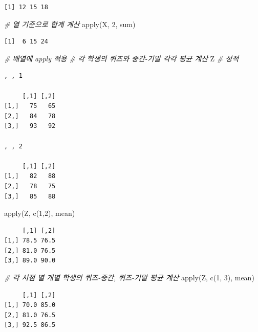 \documentclass[
  11pt,
]{krantz}
\newenvironment{Shaded}{\begin{snugshade}}{\end{snugshade}}
\newcommand{\CommentTok}[1]{\textcolor[rgb]{0.37,0.37,0.37}{\textit{#1}}}
\newcommand{\DecValTok}[1]{\textcolor[rgb]{0.06,0.06,0.06}{#1}}
\newcommand{\FunctionTok}[1]{\textcolor[rgb]{0,0,0}{#1}}
\newcommand{\NormalTok}[1]{#1}
\begin{document}
\begin{verbatim}
[1] 12 15 18
\end{verbatim}

\begin{Shaded}
\begin{Highlighting}[]
\CommentTok{\# 열 기준으로 합계 계산}
\FunctionTok{apply}\NormalTok{(X, }\DecValTok{2}\NormalTok{, sum)}
\end{Highlighting}
\end{Shaded}

\begin{verbatim}
[1]  6 15 24
\end{verbatim}

\begin{Shaded}
\begin{Highlighting}[]
\CommentTok{\# 배열에 apply 적용}
\CommentTok{\# 각 학생의 퀴즈와 중간{-}기말 각각 평균 계산}
\NormalTok{Z }\CommentTok{\# 성적}
\end{Highlighting}
\end{Shaded}

\begin{verbatim}
, , 1

     [,1] [,2]
[1,]   75   65
[2,]   84   78
[3,]   93   92

, , 2

     [,1] [,2]
[1,]   82   88
[2,]   78   75
[3,]   85   88
\end{verbatim}

\begin{Shaded}
\begin{Highlighting}[]
\FunctionTok{apply}\NormalTok{(Z, }\FunctionTok{c}\NormalTok{(}\DecValTok{1}\NormalTok{,}\DecValTok{2}\NormalTok{), mean)}
\end{Highlighting}
\end{Shaded}

\begin{verbatim}
     [,1] [,2]
[1,] 78.5 76.5
[2,] 81.0 76.5
[3,] 89.0 90.0
\end{verbatim}

\begin{Shaded}
\begin{Highlighting}[]
\CommentTok{\# 각 시점 별 개별 학생의 퀴즈{-}중간, 퀴즈{-}기말 평균 계산}
\FunctionTok{apply}\NormalTok{(Z, }\FunctionTok{c}\NormalTok{(}\DecValTok{1}\NormalTok{, }\DecValTok{3}\NormalTok{), mean)}
\end{Highlighting}
\end{Shaded}

\begin{verbatim}
     [,1] [,2]
[1,] 70.0 85.0
[2,] 81.0 76.5
[3,] 92.5 86.5
\end{verbatim}
\end{document}
